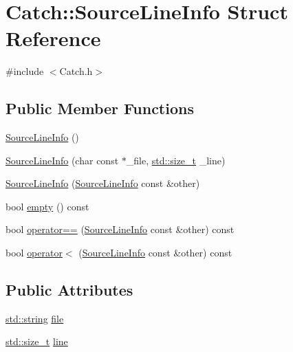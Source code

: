 \hypertarget{struct_catch_1_1_source_line_info}{}\section{Catch\+:\+:Source\+Line\+Info Struct Reference}
\label{struct_catch_1_1_source_line_info}


{\ttfamily \#include $<$Catch.\+h$>$}

\subsection*{Public Member Functions}
\begin{DoxyCompactItemize}
\item 
\hyperlink{struct_catch_1_1_source_line_info_a9d44b2e1133794eee0bd5716424c83d6}{Source\+Line\+Info} ()
\item 
\hyperlink{struct_catch_1_1_source_line_info_a6218cb890337d37f708ea94063958940}{Source\+Line\+Info} (char const $\ast$\+\_\+file, \hyperlink{_s_d_l__config_8h_a7c94ea6f8948649f8d181ae55911eeaf}{std\+::size\+\_\+t} \+\_\+line)
\item 
\hyperlink{struct_catch_1_1_source_line_info_a1ec99cc0547ce5909133aaa8f14ed4b1}{Source\+Line\+Info} (\hyperlink{struct_catch_1_1_source_line_info}{Source\+Line\+Info} const \&other)
\item 
bool \hyperlink{struct_catch_1_1_source_line_info_a9a25ffc0640d1a3dd0c9b7e5fcbba7b9}{empty} () const 
\item 
bool \hyperlink{struct_catch_1_1_source_line_info_af0854821b1abfda52796ef0f1294b050}{operator==} (\hyperlink{struct_catch_1_1_source_line_info}{Source\+Line\+Info} const \&other) const 
\item 
bool \hyperlink{struct_catch_1_1_source_line_info_a581c02d683808232168bfc2e775c3554}{operator$<$} (\hyperlink{struct_catch_1_1_source_line_info}{Source\+Line\+Info} const \&other) const 
\end{DoxyCompactItemize}
\subsection*{Public Attributes}
\begin{DoxyCompactItemize}
\item 
\hyperlink{_s_d_l__opengl__glext_8h_ae84541b4f3d8e1ea24ec0f466a8c568b}{std\+::string} \hyperlink{struct_catch_1_1_source_line_info_adf3ccf0c2bd326eb3466318af82a94dd}{file}
\item 
\hyperlink{_s_d_l__config_8h_a7c94ea6f8948649f8d181ae55911eeaf}{std\+::size\+\_\+t} \hyperlink{struct_catch_1_1_source_line_info_a841e5d696c7b9cde24e45e61dd979c77}{line}
\end{DoxyCompactItemize}


